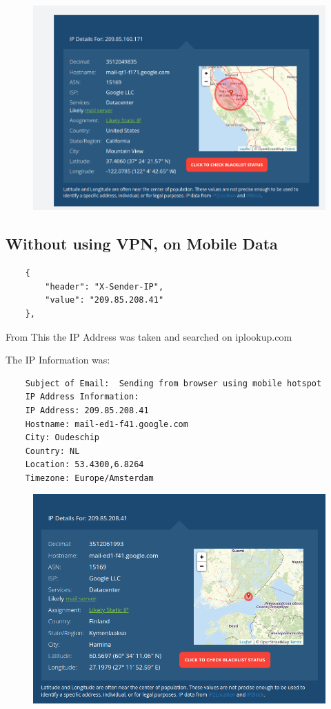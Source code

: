 \documentclass[11pt]{article}
\begin{document}
    \begin{figure}[H]
        \centering
        \includegraphics[width=.85\textwidth]{171.png}
        \caption{}
    \end{figure}

    
\subsection{Without using VPN, on Mobile Data}

\begin{verbatim}
    {
        "header": "X-Sender-IP",
        "value": "209.85.208.41"
    },
    \end{verbatim}
    
    From This the IP Address was taken and searched on iplookup.com
    
    The IP Information was: 
    \begin{verbatim}
    Subject of Email:  Sending from browser using mobile hotspot
    IP Address Information:
    IP Address: 209.85.208.41
    Hostname: mail-ed1-f41.google.com
    City: Oudeschip
    Country: NL
    Location: 53.4300,6.8264
    Timezone: Europe/Amsterdam
    \end{verbatim}
    
    \begin{figure}[H]
        \centering
        \includegraphics[width=.85\textwidth]{41.png}
        \caption{}
    \end{figure}
\end{document}
